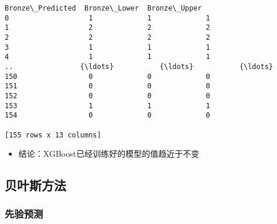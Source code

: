 \documentclass[11pt]{article}
\providecommand{\tightlist}{%
      \setlength{\itemsep}{0pt}\setlength{\parskip}{0pt}}
\begin{document}
\begin{Verbatim}[commandchars=\\\{\}]
     Bronze\_Predicted  Bronze\_Lower  Bronze\_Upper
0                   1             1             1
1                   2             2             2
2                   2             2             2
3                   1             1             1
4                   1             1             1
..                {\ldots}           {\ldots}           {\ldots}
150                 0             0             0
151                 0             0             0
152                 0             0             0
153                 1             1             1
154                 0             0             0

[155 rows x 13 columns]
    \end{Verbatim}

    \begin{itemize}
\tightlist
\item
  结论：XGBoost已经训练好的模型的值趋近于不变
\end{itemize}

    \subsection{贝叶斯方法}\label{ux8d1dux53f6ux65afux65b9ux6cd5}

    \subsubsection{先验预测}\label{ux5148ux9a8cux9884ux6d4b}
\end{document}
